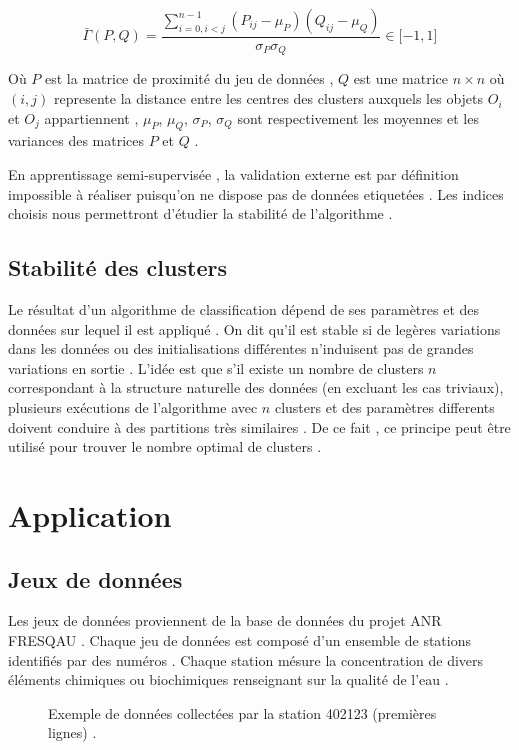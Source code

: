 \documentclass[11pt, openany]{report}
\begin{document}
\[
	\bar{\Gamma}(P,Q) = \frac {\sum_{i=0 ,i < j}^{n-1}\left(P_{ij} - \mu_P \right)\left(Q_{ij} - \mu_Q \right)}{\sigma_P\sigma_Q}  \in \lbrack -1 , 1 \rbrack 
\]

Où 
$P$ est la matrice de proximité du jeu de données  ,
$Q$ est une matrice $n \times n$ où $(i,j)$ represente la distance entre les centres des clusters auxquels  les objets $O_i$ et $O_j$ appartiennent ,
$\mu_P$, $\mu_Q$, $\sigma_P$, $\sigma_Q$ sont respectivement  les moyennes et les variances des matrices $P$ et $Q$ . 

En apprentissage semi-supervisée , la validation externe est par définition impossible à réaliser puisqu'on ne dispose pas de données etiquetées . Les indices choisis nous permettront d'étudier la stabilité  de l'algorithme .

\section{Stabilité des clusters}
Le résultat d'un algorithme de classification dépend de ses paramètres et  des données sur lequel il est appliqué . On dit qu'il est stable si de legères variations dans les données ou  des initialisations différentes n'induisent pas de grandes variations en sortie  . L'idée est que s'il existe un nombre de clusters $n$  correspondant à la structure naturelle des données (en excluant les cas triviaux),  plusieurs exécutions de l'algorithme avec $n$ clusters et des paramètres differents doivent conduire à des partitions très similaires . De ce fait , ce principe peut être utilisé pour trouver le nombre optimal de clusters .

\chapter{Application}
\section{Jeux de données }
Les jeux de données proviennent de la base de données du projet ANR FRESQAU . Chaque jeu de données est composé d'un ensemble de stations identifiés par des numéros . Chaque station mésure la concentration  de  divers éléments chimiques ou biochimiques renseignant sur la qualité de l'eau .

\begin{figure}[H]
  \centering
  \caption{Exemple de données collectées par la station 402123 (premières lignes) .}
  \label{fig:contraintes}
\end{figure}
\end{document}
